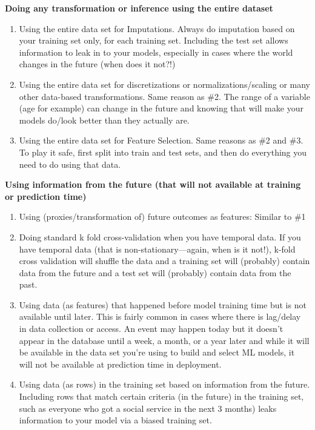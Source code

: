 \documentclass[]{krantz}
\begin{document}
\textbf{Doing any transformation or inference using the entire dataset}

\begin{enumerate}
\def\labelenumi{\arabic{enumi}.}
\setcounter{enumi}{1}
\item
  Using the entire data set for Imputations. Always do imputation based
  on your training set only, for each training set. Including the test
  set allows information to leak in to your models, especially in cases
  where the world changes in the future (when does it not?!)
\item
  Using the entire data set for discretizations or
  normalizations/scaling or many other data-based transformations. Same
  reason as \#2. The range of a variable (age for example) can change in
  the future and knowing that will make your models do/look better than
  they actually are.
\item
  Using the entire data set for Feature Selection. Same reasons as \#2
  and \#3. To play it safe, first split into train and test sets, and
  then do everything you need to do using that data.
\end{enumerate}

\textbf{Using information from the future (that will not available at
training or prediction time)}

\begin{enumerate}
\def\labelenumi{\arabic{enumi}.}
\setcounter{enumi}{4}
\item
  Using (proxies/transformation of) future outcomes as features: Similar
  to \#1
\item
  Doing standard k fold cross-validation when you have temporal data. If
  you have temporal data (that is non-stationary---again, when is it
  not!), k-fold cross validation will shuffle the data and a training
  set will (probably) contain data from the future and a test set will
  (probably) contain data from the past.
\item
  Using data (as features) that happened before model training time but
  is not available until later. This is fairly common in cases where
  there is lag/delay in data collection or access. An event may happen
  today but it doesn't appear in the database until a week, a month, or
  a year later and while it will be available in the data set you're
  using to build and select ML models, it will not be available at
  prediction time in deployment.
\item
  Using data (as rows) in the training set based on information from the
  future. Including rows that match certain criteria (in the future) in
  the training set, such as everyone who got a social service in the
  next 3 months) leaks information to your model via a biased training
  set.
\end{enumerate}
\end{document}
